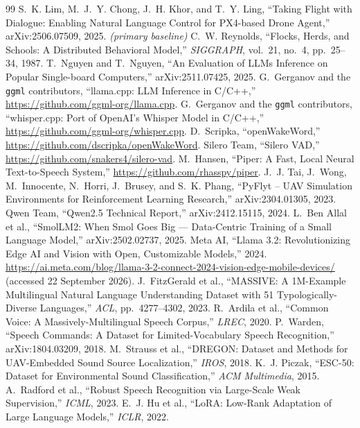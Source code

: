 
\begin{thebibliography}{99}
\small
{} S.~K. Lim, M.~J.~Y. Chong, J.~H. Khor, and T.~Y. Ling, ``Taking Flight with Dialogue:
  Enabling Natural Language Control for PX4-based Drone Agent,'' arXiv:2506.07509, 2025.
  \emph{(primary baseline)}
 C.~W. Reynolds, ``Flocks, Herds, and Schools: A Distributed Behavioral Model,''
  \emph{SIGGRAPH}, vol.~21, no.~4, pp.~25--34, 1987.
 T.~Nguyen and T.~Nguyen, ``An Evaluation of LLMs Inference on Popular Single-board
  Computers,'' arXiv:2511.07425, 2025.
 G.~Gerganov and the \texttt{ggml} contributors, ``llama.cpp: LLM Inference in
  C/C++,'' \url{https://github.com/ggml-org/llama.cpp}.
 G.~Gerganov and the \texttt{ggml} contributors, ``whisper.cpp: Port of OpenAI's
  Whisper Model in C/C++,'' \url{https://github.com/ggml-org/whisper.cpp}.
 D.~Scripka, ``openWakeWord,'' \url{https://github.com/dscripka/openWakeWord}.
 Silero Team, ``Silero VAD,'' \url{https://github.com/snakers4/silero-vad}.
 M.~Hansen, ``Piper: A Fast, Local Neural Text-to-Speech System,''
  \url{https://github.com/rhasspy/piper}.
 J.~J. Tai, J.~Wong, M.~Innocente, N.~Horri, J.~Brusey, and S.~K. Phang,
  ``PyFlyt -- UAV Simulation Environments for Reinforcement Learning Research,''
  arXiv:2304.01305, 2023.
 Qwen Team, ``Qwen2.5 Technical Report,'' arXiv:2412.15115, 2024.
 L.~Ben Allal et al., ``SmolLM2: When Smol Goes Big --- Data-Centric Training of a
  Small Language Model,'' arXiv:2502.02737, 2025.
 Meta AI, ``Llama 3.2: Revolutionizing Edge AI and Vision with Open, Customizable
  Models,'' 2024. \url{https://ai.meta.com/blog/llama-3-2-connect-2024-vision-edge-mobile-devices/}
  (accessed 22 September 2026).
 J.~FitzGerald et al., ``MASSIVE: A 1M-Example Multilingual Natural Language
  Understanding Dataset with 51 Typologically-Diverse Languages,'' \emph{ACL}, pp.~4277--4302, 2023.
 R.~Ardila et al., ``Common Voice: A Massively-Multilingual Speech Corpus,''
  \emph{LREC}, 2020.
 P.~Warden, ``Speech Commands: A Dataset for Limited-Vocabulary Speech
  Recognition,'' arXiv:1804.03209, 2018.
 M.~Strauss et al., ``DREGON: Dataset and Methods for UAV-Embedded Sound Source
  Localization,'' \emph{IROS}, 2018.
 K.~J. Piczak, ``ESC-50: Dataset for Environmental Sound Classification,''
  \emph{ACM Multimedia}, 2015.
 A.~Radford et al., ``Robust Speech Recognition via Large-Scale Weak Supervision,''
  \emph{ICML}, 2023.
 E.~J. Hu et al., ``LoRA: Low-Rank Adaptation of Large Language Models,''
  \emph{ICLR}, 2022.
\end{thebibliography}
